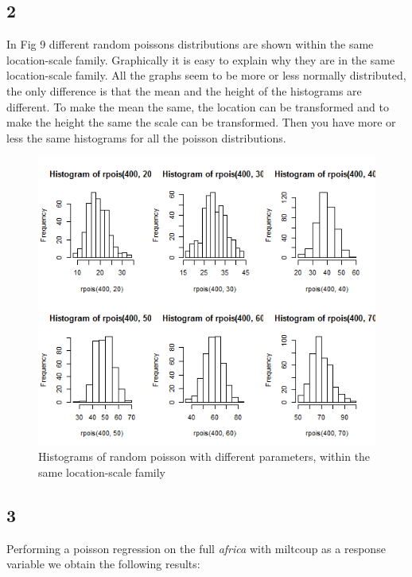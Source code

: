 \documentclass{article}
\begin{document}
    \subsection*{2}
      In Fig 9 different random poissons distributions are shown within the same location-scale family.
      Graphically it is easy to explain why they are in the same location-scale family.
      All the graphs seem to be more or less normally distributed,
      the only difference is that the mean and the height of the histograms are different.
      To make the mean the same, the location can be transformed and to make the height the same the scale can be transformed.
      Then you have more or less the same histograms for all the poisson distributions.
      \begin{figure}[H]
          \centering
          \includegraphics[scale=0.3]{../results/3_2.png}
          \caption{Histograms of random poisson with different parameters, within the same location-scale family}
          \label{fig:Hist3_2}
      \end{figure}

    \subsection*{3}
    
    Performing a poisson regression on the full \textit{africa} with miltcoup as a response variable we obtain the following results:
    
\end{document}
